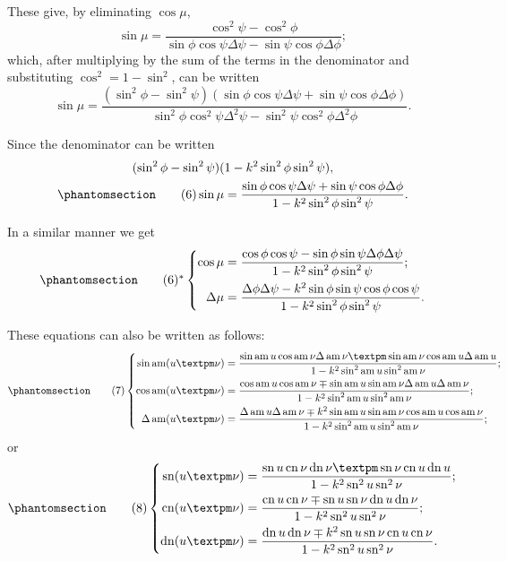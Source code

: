 \documentclass[12pt,leqno]{book}[2005/09/16]
\newcommand{\mychapno}{}%
\DeclareMathOperator{\am}{am}
\DeclareMathOperator{\cn}{cn}
\DeclareMathOperator{\dn}{dn}
\DeclareMathOperator{\sn}{sn}
\newcommand{\DPtypo}[2]{#2}
\newcommand{\Tag}[2][]{%
  \phantomsection
  \ifthenelse{\equal{#1}{}}
             {\label{eqn:\mychapno.#2}}
             {\label{eqn:\mychapno.(#1)}}
  \tag*{\normalsize\ensuremath{#2}}
}
\begin{document}
These give, by eliminating $\cos \mu$,
\[
\sin \mu = \frac{\cos^2 \psi - \cos^2 \phi}
                {\sin \phi \cos \psi \Delta \psi - \sin \psi \cos \phi \Delta \phi};
\]
which, after multiplying by the sum of the terms in the denominator
and substituting $\cos^2 = 1 - \sin^2$, can be written
\[
\sin \mu
  = \frac{(\sin^2 \phi - \sin^2 \psi)
          (\sin \phi \cos \psi \Delta \psi + \sin \psi \cos \phi \Delta \phi \DPtypo{}{)}}
         { \sin^2 \phi \cos^2 \psi \Delta^2 \psi - \sin^2 \psi \cos^2 \phi \Delta^2 \phi}.
\]

Since the denominator can be written
\begin{gather*}
(\sin^2 \phi - \sin^2 \psi)(1 - k^2 \sin^2 \phi \sin^2 \psi), \\
\Tag{(6)}
\sin \mu = \frac{\sin \phi \cos \psi \Delta \psi
               + \sin \psi \cos \phi \Delta \phi}
                {1 - k^2 \sin^2 \phi \sin^2 \psi}.
\end{gather*}

In a similar manner we get
\[
\Tag[6st]{(6)^*}
\left\{
\begin{aligned}
\cos \mu   &= \frac{\cos \phi \cos \psi - \sin \phi \sin \psi \Delta \phi \Delta \psi}
                   {1 - k^2 \sin^2 \phi \sin^2 \psi}; \\
%
\Delta \mu &= \frac{\Delta \phi \Delta \psi - k^2 \sin \phi \sin \psi \cos \phi \cos \psi}
                   {1 - k^2 \sin^2 \phi \sin^2 \psi}.
\end{aligned}
\right.
\]

These equations can also be written as follows:
\[
\Tag{(7)}
\left\{
\makebox[\linewidth-40pt][l]{$\begin{aligned}
\sin \am (u±\nu)
  &= \frac{\sin \am u \cos \am \nu \Delta \am \nu
         ± \sin \am \nu \cos \am u \Delta \am u}
          {1 - k^{2} \sin^{2} \am u \sin^{2} \am \nu}; \\
%
\cos \am (u±\nu)
  &= \frac{\cos \am u \cos \am \nu
       \mp \sin \am u \sin \am \nu \Delta \am u \Delta \am \nu}
          {1 - k^{2} \sin^{2} \am u \sin^{2} \am \nu}; \\
%
\Delta \am (u±\nu)
  &= \frac{\Delta \am u \Delta \am \nu
       \mp k^{2} \sin \am u \sin \am \nu \cos \am u \cos \am \nu}
          {1 - k^{2} \sin^{2} \am u \sin^{2} \am \nu};
\end{aligned}$}
\right.
\]
or
\[
\Tag{(8)}
\left\{
\begin{aligned}
\sn (u±\nu)
  &= \frac{\sn u \cn \nu \dn \nu ± \sn \nu \cn u \dn u}
          {1 - k^{2} \sn^{2} u \sn^{2} \nu}; \\
%
\cn (u±\nu)
  &= \frac{\cn u \cn \nu \mp \sn u \sn \nu \dn u \dn \nu}
          {1 - k^{2} \sn^{2} u \sn ^{2} \nu}; \\
%
\dn (u±\nu)
  &= \frac{\dn u \dn \nu \mp k^{2} \sn u \sn \nu \cn u \cn \nu}
          {1 - k^{2} \sn^{2} u \sn^{2} \nu}.
\end{aligned}
\right.
\]
\end{document}
